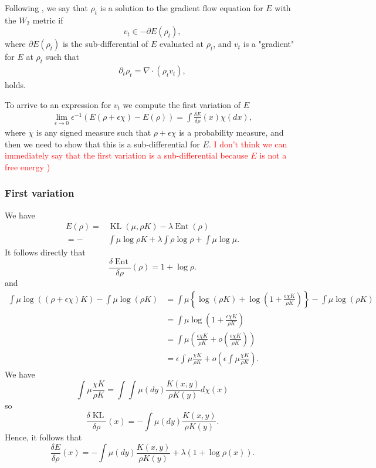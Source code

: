 \documentclass[a4paper]{article}
\DeclareMathOperator{\KL}{KL}
\DeclareMathOperator{\ent}{Ent}
\begin{document}
Following \citet[Definition 11.1.1]{ambrosio2008gradient}, we say that $\rho_t$ is a solution to the gradient flow equation for $E$ with the $W_2$ metric if
\begin{equation*}
v_t \in -\partial E(\rho_t),
\end{equation*}
where $\partial E(\rho_t)$ is the sub-differential of $E$ evaluated at $\rho_t$, and $v_t$ is a "gradient" for $E$ at $\rho_t$ such that
\begin{align*}
\partial_{t}\rho_{t}=\nabla\cdot\left(\rho_{t}v_t\right),
\end{align*} 
holds.

To arrive to an expression for $v_t$ we compute the first variation of $E$
\begin{align*}
\lim_{\epsilon\rightarrow0}\epsilon^{-1}\left(E(\rho+\epsilon\chi)-E(\rho)\right)=\int\frac{\delta E}{\delta\rho}\left(x\right)\chi\left(dx\right),
\end{align*}
where $\chi$ is any signed measure such that $\rho+\epsilon\chi$ is a probability measure, and then we need to show that this is a sub-differential for $E$.
\textcolor{red}{I don't think we can immediately say that the first variation is a sub-differential because $E$ is not a free energy \citep[Lemma 8-10]{carrillo2006contractions})}

\subsubsection{First variation}

We have
\begin{align*}
E(\rho)= & \KL(\mu,\rho K)-\lambda\ent(\rho)\\
=- & \int\mu\log\rho K+\lambda\int\rho\log\rho+\int\mu\log\mu.
\end{align*}
It follows directly that 
\[
\frac{\delta\ent }{\delta\rho}\left(\rho\right)=1+\log\rho.
\]
and 
\begin{align*}
\int\mu\log\left(\left(\rho+\epsilon\chi\right)K\right)-\int\mu\log\left(\rho K\right) & =\int\mu\left\{ \log\left(\rho K\right)+\log\left(1+\frac{\epsilon\chi K}{\rho K}\right)\right\} -\int\mu\log\left(\rho K\right)\\
 & =\int\mu\log\left(1+\frac{\epsilon\chi K}{\rho K}\right)\\
 & =\int\mu\left(\frac{\epsilon\chi K}{\rho K}+o\left(\frac{\epsilon\chi K}{\rho K}\right)\right)\\
 & =\epsilon\int\mu\frac{\chi K}{\rho K}+o\left(\epsilon\int\mu\frac{\chi K}{\rho K}\right).
\end{align*}
We have 
\[
\int\mu\frac{\chi K}{\rho K}=\int\int\mu\left(dy\right)\frac{K(x,y)}{\rho K(y)}d\chi\left(x\right)
\]
so 
\[
\frac{\delta \KL}{\delta\rho}\left(x\right)=-\int\mu\left(dy\right)\frac{K(x,y)}{\rho K(y)}.
\]
Hence, it follows that 
\begin{equation}
\label{eq:derivative}
\frac{\delta E}{\delta\rho}\left(x\right)=-\int\mu\left(dy\right)\frac{K(x,y)}{\rho K(y)}+\lambda\left(1+\log\rho\left(x\right)\right).
\end{equation}
\end{document}
